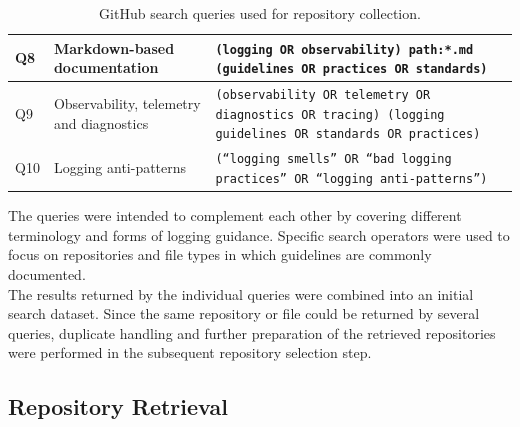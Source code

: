 \begin{table}[H]
{\begin{tabularx}{\textwidth}{p{0.8cm} p{3.3cm} X}
            Q8 &
            Markdown-based documentation &
            \texttt{(logging OR observability) path:*.md
            (guidelines OR practices OR standards)} \\
            \hline

            Q9 &
            Observability, telemetry and diagnostics &
            \texttt{(observability OR telemetry OR diagnostics OR tracing)
            (logging guidelines OR standards OR practices)} \\
            \hline

            Q10 &
            Logging anti-patterns &
            \texttt{(``logging smells'' OR ``bad logging practices'' OR ``logging anti-patterns'')} \\
            \hline

        \end{tabularx}%
    }

    \caption{GitHub search queries used for repository collection.}
    \label{tab:github_queries}
\end{table}

The queries were intended to complement each other by covering different terminology
and forms of logging guidance.
Specific search operators were used to focus on repositories and file types
in which guidelines are commonly documented.
\\
The results returned by the individual queries were combined into an initial search
dataset. Since the same repository or file could be returned by several queries,
duplicate handling and further preparation of the retrieved repositories were performed
in the subsequent repository selection step.

\subsection{Repository Retrieval}

